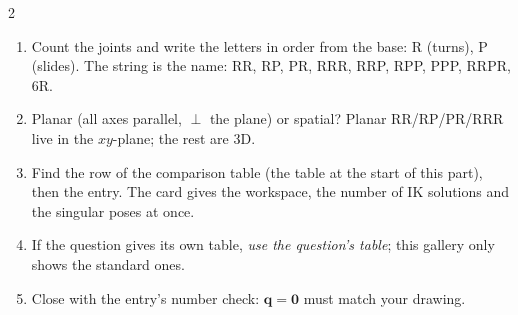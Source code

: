 \begin{multicols}{2}
\begin{fbx}
\begin{symbols}
\end{symbols}
\end{fbx}
\begin{recipe}
\begin{enumerate}
\item Count the joints and write the letters in order from the base: R (turns), P (slides). The string is the name: RR, RP, PR, RRR, RRP, RPP, PPP, RRPR, 6R.
\item Planar (all axes parallel, $\perp$ the plane) or spatial? Planar RR/RP/PR/RRR live in the $xy$-plane; the rest are 3D.
\item Find the row of the comparison table (the table at the start of this part), then the entry. The card gives the workspace, the number of IK solutions and the singular poses at once.
\item If the question gives its own table, \emph{use the question's table}; this gallery only shows the standard ones.
\item Close with the entry's number check: $\mathbf q=\mathbf 0$ must match your drawing.
\end{enumerate}
\end{recipe}


\end{multicols}
